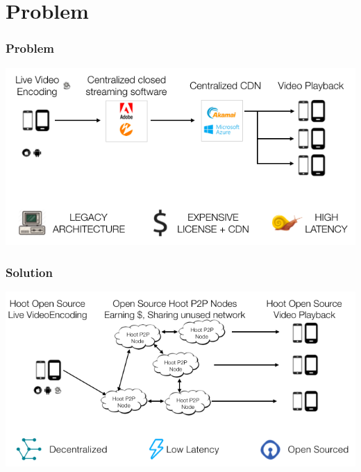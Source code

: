 \documentclass[10pt,handout]{beamer}
\begin{document}
\section{Problem}
\begin{frame}[t]\frametitle{Problem}

   \includegraphics[width=1.0\textwidth]{static/problem-architecture}

\end{frame}
\begin{frame}[t]\frametitle{Solution}
   \includegraphics[width=1.0\textwidth]{static/hoot-solution}

\end{frame}
\end{document}
